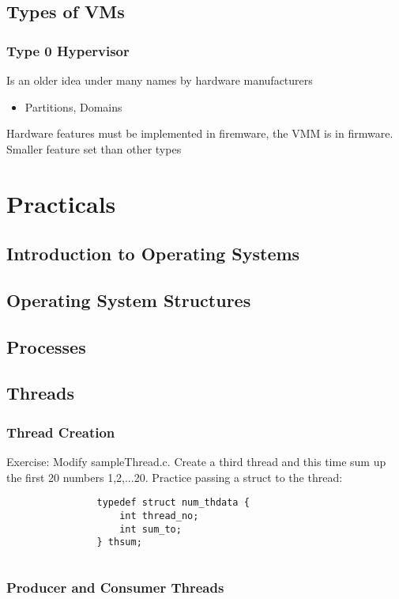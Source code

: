 \documentclass[oneside]{book}
\begin{document}
        \section{Types of VMs}
            \subsection{Type 0 Hypervisor}
                Is an older idea under many names by hardware manufacturers
                    \begin{itemize}
                        \item Partitions, Domains
                    \end{itemize}
                Hardware features must be implemented in firemware, the VMM is in firmware. Smaller feature set than other types
    \chapter{Practicals}
        \section{Introduction to Operating Systems}
        \section{Operating System Structures}
        \section{Processes}
        \section{Threads}
            \subsection{Thread Creation}
            Exercise: Modify sampleThread.c. Create a third thread and this time sum up the first 20 numbers {1,2,...20}.
            Practice passing a struct to the thread:
            \begin{verbatim}
                typedef struct num_thdata {
                    int thread_no;
                    int sum_to;
                } thsum;
            \end{verbatim}
                \inputminted{c}{code/threads/prac/sampleThread.c}
            \subsection{Producer and Consumer Threads}
\end{document}
